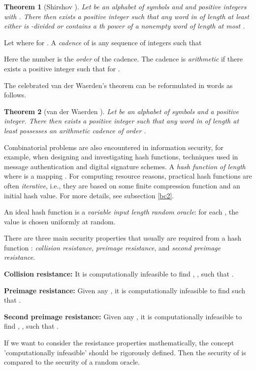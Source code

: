 \documentclass[submission,copyright,creativecommons]{eptcs}
\newtheorem{theorem}{Theorem}
\begin{document}
\begin{theorem}[Shirshov \cite{Lot,dLV,RR1}] Let  be an alphabet of  symbols and  and  positive integers with . There then  exists a positive integer  such that any word in  of length at least  either is -divided or contains a th power of a nonempty word of length at most .
\end{theorem}

Let  where  for . A \textit{cadence} of  is any sequence  of integers such that

Here the number  is the \textit{order} of the cadence. The cadence  is \textit{arithmetic} if there exists a positive integer  such that  for .

The celebrated van der Waerden's theorem can be reformulated in words as follows.

\begin{theorem}[van der Waerden \cite{Lot,dLV}] Let  be an alphabet of  symbols and  a positive integer. There then exists a positive integer  such that any word in  of length at least  possesses an arithmetic cadence of order .
\end{theorem}

Combinatorial problems are also encountered in information security, for example, when designing and investigating hash functions, techniques used in message authentication and digital signature schemes. A \textit{hash function of length } where  is a mapping . For computing resource reasons, practical hash functions are often \textit{iterative}, i.e., they are based on some finite compression function and an initial hash value. For more details, see subsection \ref{bc2}.

An ideal hash function  is a \textit{variable input length random oracle}: for
each , the value  is chosen uniformly at random. 

There are three main security properties that usually are required from a hash function : \textit{collision resistance}, \textit{preimage resistance}, and \textit{second preimage resistance}.

\textbf{Collision resistance:} It is computationally infeasible to find , , such that .

\textbf{Preimage resistance:} Given any , it is computationally infeasible to find  such that .

\textbf{Second preimage resistance:} Given any , it is computationally infeasible to find , , such that .

If we want to consider the resistance properties mathematically, the concept 'computationally infeasible' should be rigorously defined. Then the security of  is compared to the security of a random oracle. 
\end{document}
